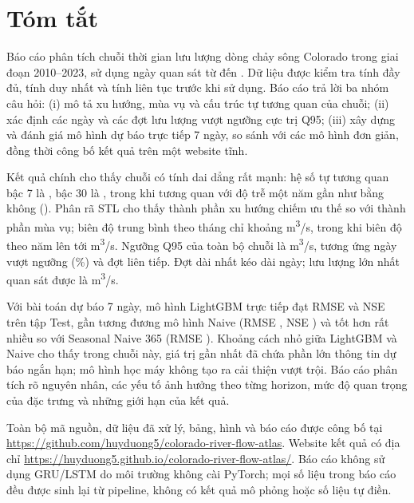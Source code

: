 \section*{Tóm tắt}

Báo cáo phân tích chuỗi thời gian lưu lượng dòng chảy sông Colorado trong giai đoạn
2010--2023, sử dụng \DatasetN{} ngày quan sát từ \DateMin{} đến \DateMax{}.
Dữ liệu được kiểm tra tính đầy đủ, tính duy nhất và tính liên tục trước khi sử dụng.
Báo cáo trả lời ba nhóm câu hỏi: (i) mô tả xu hướng, mùa vụ và cấu trúc tự tương quan
của chuỗi; (ii) xác định các ngày và các đợt lưu lượng vượt ngưỡng cực trị Q95;
(iii) xây dựng và đánh giá mô hình dự báo trực tiếp 7 ngày, so sánh với các mô hình
đơn giản, đồng thời công bố kết quả trên một website tĩnh.

Kết quả chính cho thấy chuỗi có tính dai dẳng rất mạnh: hệ số tự tương quan bậc 7
là \AcfSeven, bậc 30 là \AcfThirty, trong khi tương quan với độ trễ một năm gần như
bằng không (\AcfYear). Phân rã STL cho thấy thành phần xu hướng chiếm ưu
thế so với thành phần mùa vụ; biên độ trung bình theo tháng chỉ khoảng
\MonthlyAmplitude{} m\textsuperscript{3}/s, trong khi biên độ theo năm lên tới
\YearlyAmplitude{} m\textsuperscript{3}/s. Ngưỡng Q95 của toàn bộ chuỗi là
\QHigh{} m\textsuperscript{3}/s, tương ứng \NDaysHigh{} ngày vượt ngưỡng
(\ShareHigh{}\%) và \NEvents{} đợt liên tiếp. Đợt dài nhất kéo dài
\LongestEvent{} ngày; lưu lượng lớn nhất quan sát được là \QMax{}
m\textsuperscript{3}/s.

Với bài toán dự báo 7 ngày, mô hình LightGBM trực tiếp đạt RMSE \LgbmMeanRmse{}
và NSE \LgbmMeanNse{} trên tập Test, gần tương đương mô hình Naive
(RMSE \NaiveMeanRmse{}, NSE \NaiveMeanNse{}) và tốt hơn rất nhiều so với Seasonal
Naive 365 (RMSE \SeasonalMeanRmse{}). Khoảng cách nhỏ giữa LightGBM và Naive cho
thấy trong chuỗi này, giá trị gần nhất đã chứa phần lớn thông tin dự báo ngắn hạn;
mô hình học máy không tạo ra cải thiện vượt trội. Báo cáo phân tích rõ nguyên nhân,
các yếu tố ảnh hưởng theo từng horizon, mức độ quan trọng của đặc trưng và những
giới hạn của kết quả.

Toàn bộ mã nguồn, dữ liệu đã xử lý, bảng, hình và báo cáo được công bố tại
\url{https://github.com/huyduong5/colorado-river-flow-atlas}. Website kết quả có
địa chỉ \url{https://huyduong5.github.io/colorado-river-flow-atlas/}. Báo cáo không
sử dụng GRU/LSTM do môi trường không cài PyTorch; mọi số liệu trong báo cáo đều
được sinh lại từ pipeline, không có kết quả mô phỏng hoặc số liệu tự điền.

